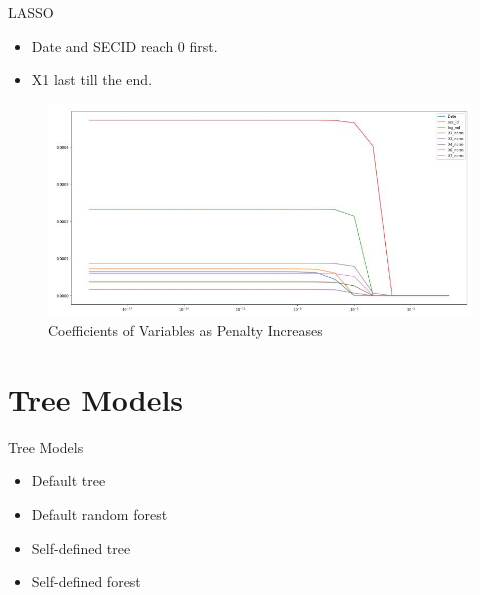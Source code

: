\documentclass{beamer}
\begin{document}
\begin{frame}{LASSO}
\begin{itemize}
    \item Date and SECID reach 0 first.
    \item X1 last till the end.
\end{itemize}

\begin{figure}[ht]
    \centering
    \includegraphics[scale=0.5]{LASSO.JPG}
    \caption{Coefficients of Variables as Penalty Increases}
    \label{fig:label}
\end{figure}

\end{frame}


\section{Tree Models}
\begin{frame}{Tree Models}
\begin{itemize}
    \item Default tree
    \item Default random forest
    \item Self-defined tree
    \item Self-defined forest
\end{itemize}
\end{frame}
\end{document}
